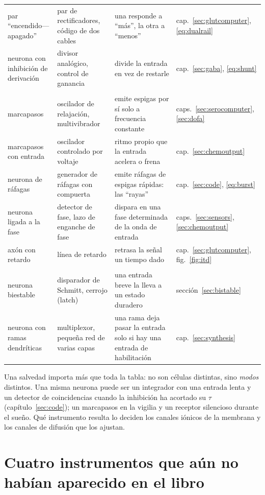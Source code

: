 \begin{center}
\begin{longtable}{>{\raggedright}p{3.1cm}>{\raggedright}p{3.3cm}>{\raggedright}p{4.7cm}>{\raggedright\arraybackslash}p{2.4cm}}
par “encendido---apagado” & par de rectificadores, código de dos cables & una responde a “más”, la otra a “menos” & cap.~\ref{sec:glutcomputer}, \eqref{eq:dualrail} \\
neurona con inhibición de derivación & divisor analógico, control de ganancia & divide la entrada en vez de restarle & cap.~\ref{sec:gaba}, \eqref{eq:shunt} \\
\midrule
\multicolumn{4}{l}{\emph{Generadores y tiempo}} \\
marcapasos & oscilador de relajación, multivibrador & emite espigas por sí solo a frecuencia constante & caps.~\ref{sec:serocomputer}, \ref{sec:dofa} \\
marcapasos con entrada & oscilador controlado por voltaje & ritmo propio que la entrada acelera o frena & cap.~\ref{sec:chemoutput} \\
neurona de ráfagas & generador de ráfagas con compuerta & emite ráfagas de espigas rápidas: las “rayas” & cap.~\ref{sec:code}, \eqref{eq:burst} \\
neurona ligada a la fase & detector de fase, lazo de enganche de fase & dispara en una fase determinada de la onda de entrada & caps.~\ref{sec:sensors}, \ref{sec:chemoutput} \\
axón con retardo & línea de retardo & retrasa la señal un tiempo dado & cap.~\ref{sec:glutcomputer}, fig.~\ref{fig:itd} \\
\midrule
\multicolumn{4}{l}{\emph{Memoria y conmutación}} \\
neurona biestable & disparador de Schmitt, cerrojo (latch) & una entrada breve la lleva a un estado duradero & sección~\ref{sec:bistable} \\
neurona con ramas dendríticas & multiplexor, pequeña red de varias capas & una rama deja pasar la entrada solo si hay una entrada de habilitación & cap.~\ref{sec:synthesis} \\
\end{longtable}
\end{center}

Una salvedad importa más que toda la tabla: no son células distintas, sino \emph{modos} distintos. Una misma neurona puede ser un integrador con una entrada lenta y un detector de coincidencias cuando la inhibición ha acortado su $\tau$ (capítulo~\ref{sec:code}); un marcapasos en la vigilia y un receptor silencioso durante el sueño. Qué instrumento resulta lo deciden los canales iónicos de la membrana y los canales de difusión que los ajustan.

\section{Cuatro instrumentos que aún no habían aparecido en el libro}

